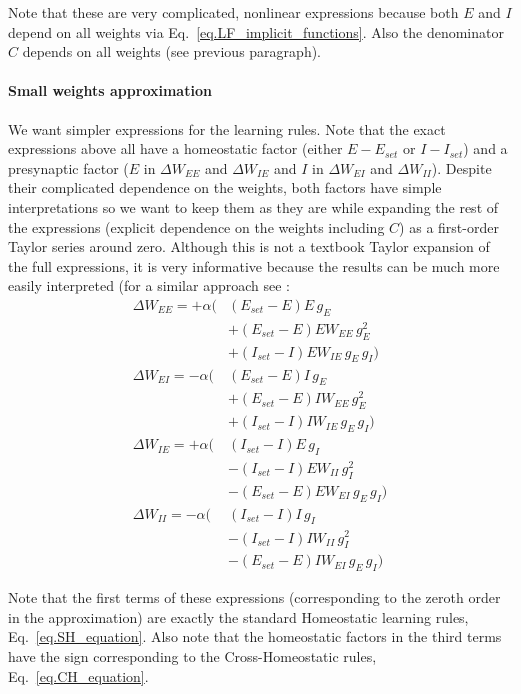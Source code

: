 \documentclass[twocolumn]{article}
\newcommand{\EE}{\mathit{EE}}
\newcommand{\EI}{\mathit{EI}}
\newcommand{\IE}{\mathit{IE}}
\newcommand{\II}{\mathit{II}}
\newcommand{\set}{\mathit{set}}
\begin{document}
\noindent Note that these are very complicated, nonlinear expressions because both $E$ and $I$ depend on all weights via Eq.\ \ref{eq.LF_implicit_functions}. Also the denominator $C$ depends on all weights (see previous paragraph).


\paragraph{Small weights approximation}

We want simpler expressions for the learning rules. Note that the exact expressions above all have a homeostatic factor (either $E - E_{\set}$ or $I - I_{\set}$) and a presynaptic factor ($E$ in $\Delta W_{\EE}$ and $\Delta W_{\IE}$ and $I$ in $\Delta W_{\EI}$ and $\Delta W_{\II}$). Despite their complicated dependence on the weights, both factors have simple interpretations so we want to keep them as they are while expanding the rest of the expressions (explicit dependence on the weights including $C$) as a first-order Taylor series around zero. Although this is not a textbook Taylor expansion of the full expressions, it is very informative because the results can be much more easily interpreted (for a similar approach see \cite{Mackwood2020}:
\begin{equation}
\begin{aligned}
\Delta W_{\EE} = + \alpha( & (E_{\set} - E)E \, g_E \\
& + (E_{\set} - E)E W_{\EE} \, g_E^2 \\
& + (I_{\set} - I)E W_{\IE} \, g_E \, g_I) \\
\Delta W_{\EI} = - \alpha( & (E_{\set} - E)I \, g_E \\
& + (E_{\set} - E)I W_{\EE} \, g_E^2 \\
& + (I_{\set} - I)I W_{\IE} \, g_E \, g_I) \\
\Delta W_{\IE} = + \alpha( & (I_{\set} - I)E \, g_I \\
& - (I_{\set} - I)E W_{\II} \, g_I^2 \\
& - (E_{\set} - E)E W_{\EI} \, g_E \, g_I) \\
\Delta W_{\II} = - \alpha( & (I_{\set} - I)I \, g_I \\
& - (I_{\set} - I)I W_{\II} \, g_I^2 \\
& - (E_{\set} - E)I W_{\EI} \, g_E \, g_I)
\end{aligned}
\label{eq.LF_smallweights}
\end{equation}

\noindent Note that the first terms of these expressions (corresponding to the zeroth order in the approximation) are exactly the standard Homeostatic learning rules, Eq.\ \ref{eq.SH_equation}. Also note that the homeostatic factors in the third terms have the sign corresponding to the Cross-Homeostatic rules, Eq.\ \ref{eq.CH_equation}.


\printbibliography
\end{document}
